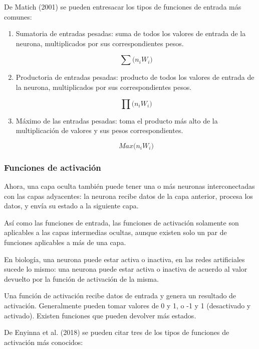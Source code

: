 \documentclass[a4paper,12pt,oneside,spanish]{book}
\begin{document}
De Matich (2001) se pueden entresacar los tipos de funciones de entrada más comunes:
\begin{enumerate}
	\item Sumatoria de entradas pesadas: suma de todos los valores de
	entrada de la neurona, multiplicados por sus correspondientes pesos.\par 
	\[\sum \textit{($n_i$$W_i$)} \]
	
	\item Productoria de entradas pesadas: producto de todos los valores de entrada de la neurona, multiplicados por sus correspondientes pesos.\par 
	\[\prod \textit{($n_i$$W_i$)} \]

	\item Máximo de las entradas pesadas: toma el producto más alto de la multiplicación de valores y sus pesos correspondientes.\par 
	
	\[ \textit{Max($n_i$$W_i$)} \]
\end{enumerate}


\subsubsection{Funciones de activación}
Ahora, una capa oculta también puede tener una o más neuronas interconectadas con las capas adyacentes: la neurona recibe datos de la capa anterior, procesa los datos, y envía su estado a la siguiente capa.\par

Así como las funciones de entrada, las funciones de activación solamente son aplicables a las capas intermedias ocultas, aunque existen solo un par de funciones aplicables a más de una capa.\par

En biología, una neurona puede estar activa o inactiva, en las redes artificiales sucede lo mismo: una neurona puede estar activa o inactiva de acuerdo al valor devuelto por la función de activación de la misma.\par

Una función de activación recibe datos de entrada y genera un resultado de activación. Generalmente pueden tomar valores de 0 y 1, o -1 y 1 (desactivado y activado). Existen funciones que pueden devolver más estados.\par

De Enyinna et al. (2018) se pueden citar tres de los tipos de funciones de activación más conocidos:
\end{document}
